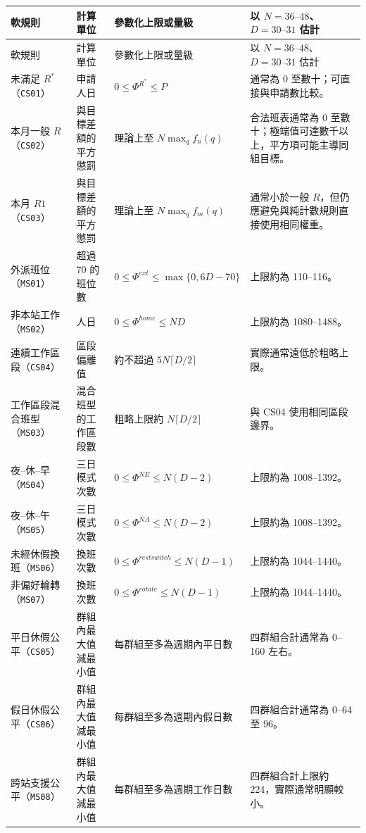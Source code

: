 \documentclass[12pt]{article}
\begin{document}
\small
\begin{longtable}{p{3.0cm}p{3.0cm}p{4.4cm}p{5.0cm}}
  \toprule
  軟規則 & 計算單位 & 參數化上限或量級 & 以 \(N=36\text{--}48\)、\(D=30\text{--}31\) 估計 \\
  \midrule
  \endfirsthead
  \toprule
  軟規則 & 計算單位 & 參數化上限或量級 & 以 \(N=36\text{--}48\)、\(D=30\text{--}31\) 估計 \\
  \midrule
  \endhead
  未滿足 \(R^*\)（\texttt{CS01}） & 申請人日 & \(0\leq\Phi^{R^*}\leq P\) & 通常為 0 至數十；可直接與申請數比較。 \\
  本月一般 \(R\)（\texttt{CS02}） & 與目標差額的平方懲罰 & 理論上至 \(N\max_q f_n(q)\) & 合法班表通常為 0 至數十；極端值可達數千以上，平方項可能主導同組目標。 \\
  本月 \(R1\)（\texttt{CS03}） & 與目標差額的平方懲罰 & 理論上至 \(N\max_q f_m(q)\) & 通常小於一般 \(R\)，但仍應避免與純計數規則直接使用相同權重。 \\
  外派班位（\texttt{MS01}） & 超過 70 的班位數 & \(0\leq\Phi^{ext}\leq\max\{0,6D-70\}\) & 上限約為 110--116。 \\
  非本站工作（\texttt{MS02}） & 人日 & \(0\leq\Phi^{home}\leq ND\) & 上限約為 1080--1488。 \\
  連續工作區段（\texttt{CS04}） & 區段偏離值 & 約不超過 \(5N\lceil D/2\rceil\) & 實際通常遠低於粗略上限。 \\
  工作區段混合班型（\texttt{MS03}） & 混合班型的工作區段數 & 粗略上限約 \(N\lceil D/2\rceil\) & 與 CS04 使用相同區段邊界。 \\
  夜--休--早（\texttt{MS04}） & 三日模式次數 & \(0\leq\Phi^{NE}\leq N(D-2)\) & 上限約為 1008--1392。 \\
  夜--休--午（\texttt{MS05}） & 三日模式次數 & \(0\leq\Phi^{NA}\leq N(D-2)\) & 上限約為 1008--1392。 \\
  未經休假換班（\texttt{MS06}） & 換班次數 & \(0\leq\Phi^{restswitch}\leq N(D-1)\) & 上限約為 1044--1440。 \\
  非偏好輪轉（\texttt{MS07}） & 換班次數 & \(0\leq\Phi^{rotate}\leq N(D-1)\) & 上限約為 1044--1440。 \\
  平日休假公平（\texttt{CS05}） & 群組內最大值減最小值 & 每群組至多為週期內平日數 & 四群組合計通常為 0--160 左右。 \\
  假日休假公平（\texttt{CS06}） & 群組內最大值減最小值 & 每群組至多為週期內假日數 & 四群組合計通常為 0--64 至 96。 \\
  跨站支援公平（\texttt{MS08}） & 群組內最大值減最小值 & 每群組至多為週期工作日數 & 四群組合計上限約 224，實際通常明顯較小。 \\
  \bottomrule
\end{longtable}
\normalsize
\end{document}

